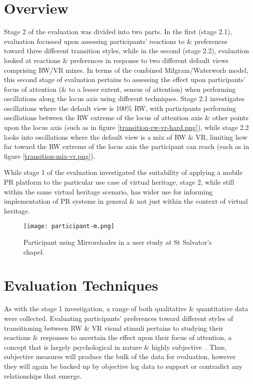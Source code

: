 \section{Overview}

Stage 2 of the evaluation was divided into two parts. In the first (stage 2.1), evaluation focussed upon assessing participants' reactions to \& preferences toward three different transition styles, while in the second (stage 2.2), evaluation looked at reactions \& preferences in response to two different default views comprising RW/VR mixes. In terms of the combined Milgram/Waterworh model, this second stage of evaluation pertains to assessing the effect upon participants' focus of attention (\& to a lesser extent, sensus of attention) when performing oscillations along the locus axis using different techniques. Stage 2.1 investigates oscillations where the default view is 100\% RW, with participants performing oscillations between the RW extreme of the locus of attention axis \& other points upon the locus axis (such as in figure \ref{transition-rw-vr-hard.png}), while stage 2.2 looks into oscillations where the default view is a mix of RW \& VR, limiting how far toward the RW extreme of the locus axis the participant can reach (such as in figure \ref{transition-mix-vr.png}).

While stage 1 of the evaluation investigated the suitability of applying a mobile PR platform to the particular use case of virtual heritage, stage 2, while still within the same virtual heritage scenario, has wider use for informing implementation of PR systems in general \& not just within the context of virtual heritage.

\begin{figure}[ht]
	\begin{center}
		\texttt{[image: participant-m.png]}
		\caption{Participant using Mirrorshades in a user study at St Salvator's chapel.}
		\label{participant-m.png}
	\end{center}
\end{figure}


\section{Evaluation Techniques}

As with the stage 1 investigation, a range of both qualitative \& quantitative data were collected. Evaluating participants' preferences toward different styles of transitioning between RW \& VR visual stimuli pertains to studying their reactions \& responses to ascertain the effect upon their focus of attention, a concept that is largely psychological in nature \& highly subjective~\cite{Ijsselsteijn2001}. Thus, subjective measures will produce the bulk of the data for evaluation, however they will again be backed up by objective log data to support or contradict any relationships that emerge.

